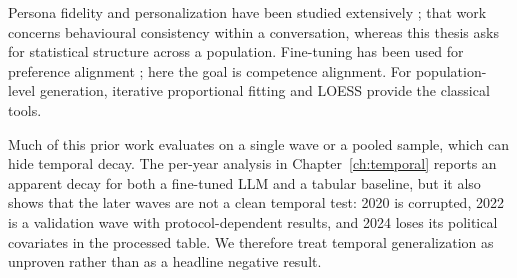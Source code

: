 Persona fidelity and personalization have been studied extensively
\citep{park2023generative,park2024,wang2024,xu2024,salemi2024,ng2024}; that work concerns
behavioural consistency within a conversation, whereas this thesis asks for
statistical structure across a population. Fine-tuning has been used for
preference alignment \citep{chu2023,zhao2023}; here the goal is competence
alignment. For population-level generation, iterative proportional fitting
\citep{deming1940,fienberg1970} and LOESS \citep{cleveland1979} provide the
classical tools.

Much of this prior work evaluates on a single wave or a pooled sample, which can
hide temporal decay. The per-year analysis in Chapter~\ref{ch:temporal} reports
an apparent decay for both a fine-tuned LLM and a tabular baseline, but it also
shows that the later waves are not a clean temporal test: 2020 is corrupted,
2022 is a validation wave with protocol-dependent results, and 2024 loses its
political covariates in the processed table. We therefore treat temporal
generalization as unproven rather than as a headline negative result.
